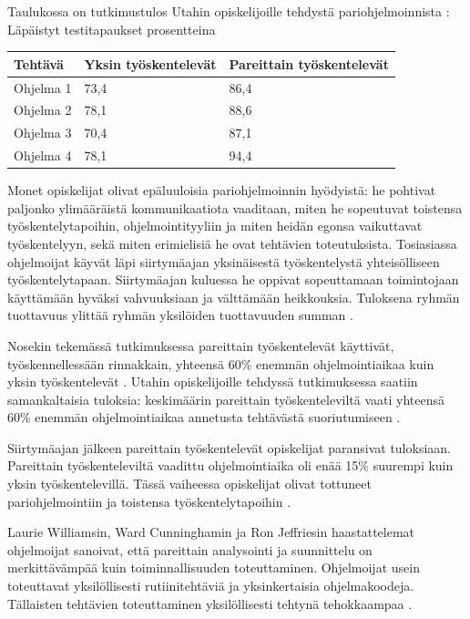 \documentclass[finnish]{tktltiki2}
\theoremstyle{definition}
\theoremstyle{remark}
\begin{document}
{Taulukossa on tutkimustulos Utahin opiskelijoille tehdystä pariohjelmoinnista \cite{WIL00}:
Läpäistyt testitapaukset prosentteina
\begin{center}
\begin{tabular}{ | l | l | p{5cm} |}
\hline
Tehtävä & Yksin työskentelevät & Pareittain työskentelevät \\ \hline
Ohjelma 1 & 73,4 & 86,4 \\ \hline
Ohjelma 2 & 78,1 & 88,6 \\ \hline
Ohjelma 3 & 70,4 & 87,1 \\ \hline
Ohjelma 4 & 78,1 & 94,4 \\ \hline
\end{tabular}
\end{center}

Monet opiskelijat olivat epäluuloisia pariohjelmoinnin hyödyistä: he pohtivat paljonko ylimääräistä kommunikaatiota vaaditaan, miten he sopeutuvat toistensa työskentelytapoihin, ohjelmointityyliin ja miten heidän egonsa vaikuttavat työskentelyyn, sekä miten erimielisiä he ovat tehtävien toteutuksista. Tosiasiassa ohjelmoijat käyvät läpi siirtymäajan yksinäisestä työskentelystä yhteisölliseen työskentelytapaan. Siirtymäajan kuluessa he oppivat sopeuttamaan toimintojaan käyttämään hyväksi vahvuuksiaan ja välttämään heikkouksia. Tuloksena ryhmän tuottavuus ylittää ryhmän yksilöiden tuottavuuden summan \cite{WIL00}.

Nosekin tekemässä tutkimuksessa pareittain työskentelevät käyttivät, työskennellessään rinnakkain, yhteensä 60\% enemmän ohjelmointiaikaa kuin yksin työskentelevät \cite{NOS98}. Utahin opiskelijoille tehdyssä tutkimuksessa saatiin samankaltaisia tuloksia: keskimäärin pareittain työskenteleviltä vaati yhteensä 60\% enemmän ohjelmointiaikaa annetusta tehtävästä suoriutumiseen \cite{WIL00}.

Siirtymäajan jälkeen pareittain työskentelevät opiskelijat paransivat tuloksiaan. Pareittain työskenteleviltä vaadittu ohjelmointiaika oli enää 15\% suurempi kuin yksin työskentelevillä. Tässä vaiheessa opiskelijat olivat tottuneet pariohjelmointiin ja toistensa työskentelytapoihin \cite{WIL00}.

Laurie Williamsin, Ward Cunninghamin ja Ron Jeffriesin haastattelemat ohjelmoijat sanoivat, että pareittain analysointi ja suunnittelu on merkittävämpää kuin toiminnallisuuden toteuttaminen. Ohjelmoijat usein toteuttavat yksilöllisesti rutiinitehtäviä ja yksinkertaisia ohjelmakoodeja. Tällaisten tehtävien toteuttaminen yksilöllisesti tehtynä tehokkaampaa \cite{WIL00}.

}
\end{document}
